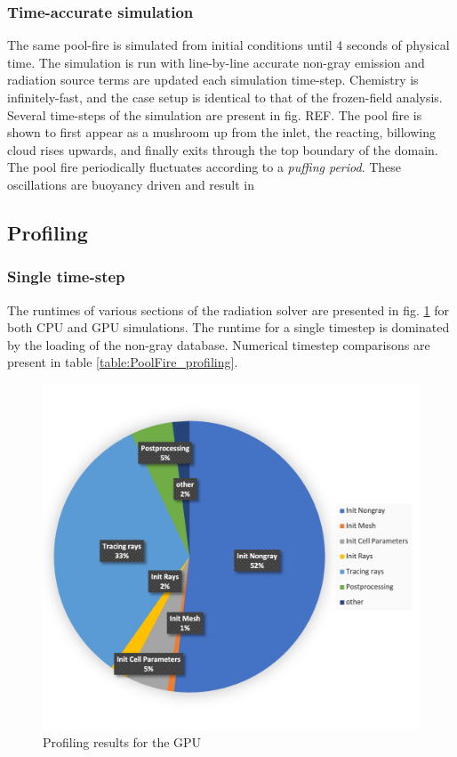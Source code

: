 \subsubsection{Time-accurate simulation}
The same pool-fire is simulated from initial conditions until 4 seconds of physical time.
The simulation is run with line-by-line accurate non-gray emission and radiation source terms are updated each simulation time-step. Chemistry is infinitely-fast, and the case setup is identical to that of the frozen-field analysis.
Several time-steps of the simulation are present in fig. REF. The pool fire is shown to first appear as a mushroom up from the inlet, the reacting, billowing cloud rises upwards, and finally exits through the top boundary of the domain.
The pool fire periodically fluctuates according to a \textit{puffing period}. These oscillations are buoyancy driven and result in 


\subsection{Profiling}
\subsubsection{Single time-step}
The runtimes of various sections of the radiation solver are presented in fig. \ref{fig:PoolFire_profiling} for both CPU and GPU simulations.
The runtime for a single timestep is dominated by the loading of the non-gray database. Numerical timestep comparisons are present in table \ref{table:PoolFire_profiling}.

\begin{figure}
\includegraphics[width=0.75\linewidth]{figures/ch4/PoolFire_profiling_OnetimestepGPU.png}
\caption{Profiling results for the GPU}
\label{fig:PoolFire_profiling}
\end{figure}

